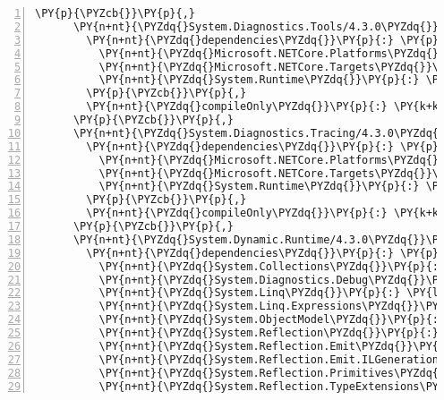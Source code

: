 \begin{Verbatim}[commandchars=\\\{\},numbers=left,firstnumber=1,stepnumber=1,numberblanklines=0]
      \PY{p}{\PYZcb{}}\PY{p}{,}
      \PY{n+nt}{\PYZdq{}System.Diagnostics.Tools/4.3.0\PYZdq{}}\PY{p}{:} \PY{p}{\PYZob{}}
        \PY{n+nt}{\PYZdq{}dependencies\PYZdq{}}\PY{p}{:} \PY{p}{\PYZob{}}
          \PY{n+nt}{\PYZdq{}Microsoft.NETCore.Platforms\PYZdq{}}\PY{p}{:} \PY{l+s+s2}{\PYZdq{}2.1.0\PYZhy{}rc1\PYZdq{}}\PY{p}{,}
          \PY{n+nt}{\PYZdq{}Microsoft.NETCore.Targets\PYZdq{}}\PY{p}{:} \PY{l+s+s2}{\PYZdq{}2.1.0\PYZhy{}rc1\PYZdq{}}\PY{p}{,}
          \PY{n+nt}{\PYZdq{}System.Runtime\PYZdq{}}\PY{p}{:} \PY{l+s+s2}{\PYZdq{}4.3.0\PYZdq{}}
        \PY{p}{\PYZcb{}}\PY{p}{,}
        \PY{n+nt}{\PYZdq{}compileOnly\PYZdq{}}\PY{p}{:} \PY{k+kc}{true}
      \PY{p}{\PYZcb{}}\PY{p}{,}
      \PY{n+nt}{\PYZdq{}System.Diagnostics.Tracing/4.3.0\PYZdq{}}\PY{p}{:} \PY{p}{\PYZob{}}
        \PY{n+nt}{\PYZdq{}dependencies\PYZdq{}}\PY{p}{:} \PY{p}{\PYZob{}}
          \PY{n+nt}{\PYZdq{}Microsoft.NETCore.Platforms\PYZdq{}}\PY{p}{:} \PY{l+s+s2}{\PYZdq{}2.1.0\PYZhy{}rc1\PYZdq{}}\PY{p}{,}
          \PY{n+nt}{\PYZdq{}Microsoft.NETCore.Targets\PYZdq{}}\PY{p}{:} \PY{l+s+s2}{\PYZdq{}2.1.0\PYZhy{}rc1\PYZdq{}}\PY{p}{,}
          \PY{n+nt}{\PYZdq{}System.Runtime\PYZdq{}}\PY{p}{:} \PY{l+s+s2}{\PYZdq{}4.3.0\PYZdq{}}
        \PY{p}{\PYZcb{}}\PY{p}{,}
        \PY{n+nt}{\PYZdq{}compileOnly\PYZdq{}}\PY{p}{:} \PY{k+kc}{true}
      \PY{p}{\PYZcb{}}\PY{p}{,}
      \PY{n+nt}{\PYZdq{}System.Dynamic.Runtime/4.3.0\PYZdq{}}\PY{p}{:} \PY{p}{\PYZob{}}
        \PY{n+nt}{\PYZdq{}dependencies\PYZdq{}}\PY{p}{:} \PY{p}{\PYZob{}}
          \PY{n+nt}{\PYZdq{}System.Collections\PYZdq{}}\PY{p}{:} \PY{l+s+s2}{\PYZdq{}4.3.0\PYZdq{}}\PY{p}{,}
          \PY{n+nt}{\PYZdq{}System.Diagnostics.Debug\PYZdq{}}\PY{p}{:} \PY{l+s+s2}{\PYZdq{}4.3.0\PYZdq{}}\PY{p}{,}
          \PY{n+nt}{\PYZdq{}System.Linq\PYZdq{}}\PY{p}{:} \PY{l+s+s2}{\PYZdq{}4.3.0\PYZdq{}}\PY{p}{,}
          \PY{n+nt}{\PYZdq{}System.Linq.Expressions\PYZdq{}}\PY{p}{:} \PY{l+s+s2}{\PYZdq{}4.3.0\PYZdq{}}\PY{p}{,}
          \PY{n+nt}{\PYZdq{}System.ObjectModel\PYZdq{}}\PY{p}{:} \PY{l+s+s2}{\PYZdq{}4.3.0\PYZdq{}}\PY{p}{,}
          \PY{n+nt}{\PYZdq{}System.Reflection\PYZdq{}}\PY{p}{:} \PY{l+s+s2}{\PYZdq{}4.3.0\PYZdq{}}\PY{p}{,}
          \PY{n+nt}{\PYZdq{}System.Reflection.Emit\PYZdq{}}\PY{p}{:} \PY{l+s+s2}{\PYZdq{}4.3.0\PYZdq{}}\PY{p}{,}
          \PY{n+nt}{\PYZdq{}System.Reflection.Emit.ILGeneration\PYZdq{}}\PY{p}{:} \PY{l+s+s2}{\PYZdq{}4.3.0\PYZdq{}}\PY{p}{,}
          \PY{n+nt}{\PYZdq{}System.Reflection.Primitives\PYZdq{}}\PY{p}{:} \PY{l+s+s2}{\PYZdq{}4.3.0\PYZdq{}}\PY{p}{,}
          \PY{n+nt}{\PYZdq{}System.Reflection.TypeExtensions\PYZdq{}}\PY{p}{:} \PY{l+s+s2}{\PYZdq{}4.3.0\PYZdq{}}\PY{p}{,}

\end{Verbatim}
